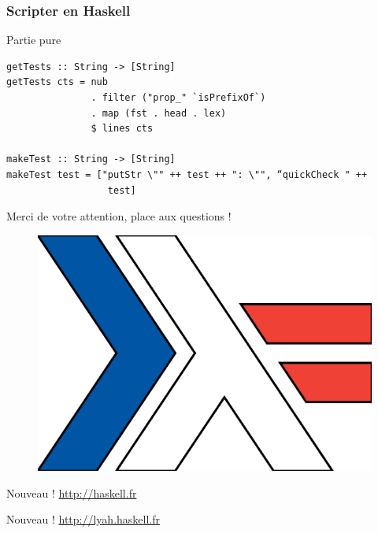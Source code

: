\documentclass[10pt]{beamer}
\begin{document}
\begin{frame}[fragile]
\frametitle{Scripter en Haskell}
\begin{block}{Partie pure}
\begin{verbatim}
getTests :: String -> [String]
getTests cts = nub
               . filter ("prop_" `isPrefixOf`)
               . map (fst . head . lex)
               $ lines cts

makeTest :: String -> [String]
makeTest test = ["putStr \"" ++ test ++ ": \"", “quickCheck " ++
                  test]
\end{verbatim}
\end{block}
\end{frame}



\begin{frame}
\centerline{Merci de votre attention, place aux questions !}

\begin{figure}
\includegraphics[scale=0.4]{haskell_fr_logo.png}
\end{figure}

\centerline{Nouveau ! \url{http://haskell.fr}}

\centerline{Nouveau ! \url{http://lyah.haskell.fr}}
\end{frame}
\end{document}
